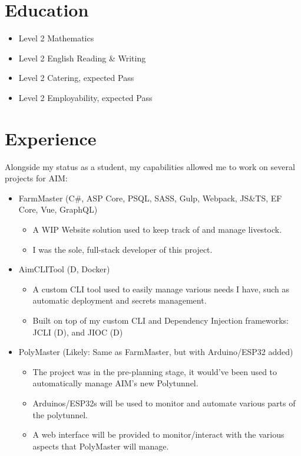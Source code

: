 \documentclass[11pt,a4paper,sans]{moderncv}
\title{}
\begin{document}
\makecvtitle

\section{Education}
{
    \begin{itemize}
        \item Level 2 Mathematics
        \item Level 2 English Reading \& Writing
        \item Level 2 Catering, expected Pass
        \item Level 2 Employability, expected Pass
    \end{itemize}
}
{
}

\section{Experience}
{
    Alongside my status as a student, my capabilities allowed me to work on
    several projects for AIM:
    \begin{itemize}
        \item FarmMaster (C\#, ASP Core, PSQL, SASS, Gulp, Webpack, JS\&TS, EF Core, Vue, GraphQL)
        \begin{itemize}
            \item A WIP Website solution used to keep track of and manage livestock.
            \item I was the sole, full-stack developer of this project.
        \end{itemize}
        \item AimCLITool (D, Docker)
        \begin{itemize}
            \item A custom CLI tool used to easily manage various needs I have, such as automatic deployment and secrets management.
            \item Built on top of my custom CLI and Dependency Injection frameworks: JCLI (D), and JIOC (D)
        \end{itemize}
        \item PolyMaster (Likely: Same as FarmMaster, but with Arduino/ESP32 added)
        \begin{itemize}
            \item The project was in the pre-planning stage, it would've been used to automatically manage AIM's new Polytunnel.
            \item Arduinos/ESP32s will be used to monitor and automate various parts of the polytunnel.
            \item A web interface will be provided to monitor/interact with the various aspects that PolyMaster will manage.
        \end{itemize}
    \end{itemize}
}
\end{document}
